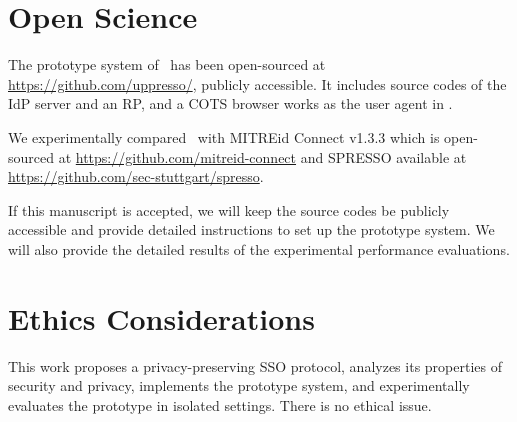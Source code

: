 \newpage


\section*{Open Science}
The prototype system of \usso\ has been open-sourced at \url{https://github.com/uppresso/}, publicly accessible.
It includes source codes of the IdP server and an RP,
    and a COTS browser works as the user agent in \usso.

We experimentally compared \usso\ with MITREid Connect v1.3.3 which is  open-sourced
 at \url{https://github.com/mitreid-connect}
    and SPRESSO available at \url{https://github.com/sec-stuttgart/spresso}.

If this manuscript is accepted,
    we will keep the source codes be publicly accessible
        and provide detailed instructions to set up the prototype system.
We will also provide the detailed results of the experimental performance evaluations.

\section*{Ethics Considerations}
This work proposes a privacy-preserving SSO protocol, analyzes its properties of security and privacy,
    implements the prototype system,
    and experimentally evaluates the prototype in isolated settings.
There is no ethical issue.

